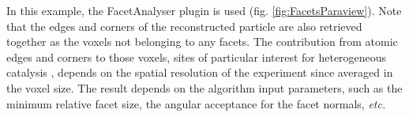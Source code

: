 In this example, the FacetAnalyser plugin is used (fig. \ref{fig:FacetsParaview}).
Note that the edges and corners of the reconstructed particle are also retrieved together as the voxels not belonging to any facets.
The contribution from atomic edges and corners to those voxels, sites of particular interest for heterogeneous catalysis \parencite{Taylor1925}, depends on the spatial resolution of the experiment since averaged in the voxel size.
The result depends on the algorithm input parameters, such as the minimum relative facet size, the angular acceptance for the facet normals, \textit{etc.}